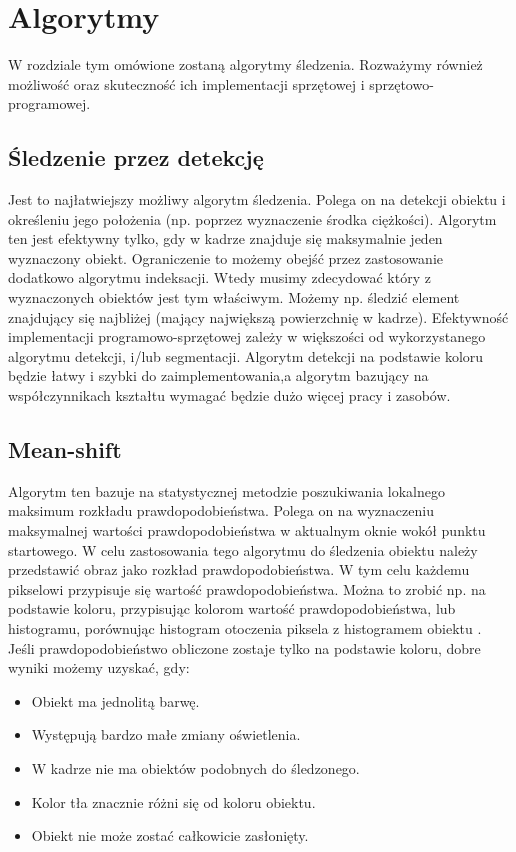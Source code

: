 \chapter{Algorytmy}
\label{cha:algorytmy}

W rozdziale tym omówione zostaną algorytmy śledzenia. Rozważymy również możliwość oraz skuteczność ich implementacji sprzętowej i sprzętowo-programowej.

\section{Śledzenie przez detekcję}
\label{sec:sledzenieprzezdetekcje}

Jest to najłatwiejszy możliwy algorytm śledzenia. Polega on na detekcji obiektu i określeniu jego położenia (np. poprzez wyznaczenie środka ciężkości). Algorytm ten jest efektywny tylko, gdy w kadrze znajduje się maksymalnie jeden wyznaczony obiekt. Ograniczenie to możemy obejść przez zastosowanie dodatkowo algorytmu indeksacji. Wtedy musimy zdecydować który z wyznaczonych obiektów jest tym właściwym. Możemy np. śledzić element znajdujący się najbliżej (mający największą powierzchnię w kadrze). Efektywność implementacji programowo-sprzętowej zależy w większości od wykorzystanego algorytmu detekcji, i/lub segmentacji. Algorytm detekcji na podstawie koloru będzie łatwy i szybki do zaimplementowania,a algorytm bazujący na współczynnikach kształtu  wymagać będzie dużo więcej pracy i zasobów.

\section{Mean-shift}
\label{sec:meanshift}

Algorytm ten bazuje na statystycznej metodzie poszukiwania lokalnego maksimum rozkładu prawdopodobieństwa. Polega on na wyznaczeniu maksymalnej wartości prawdopodobieństwa w aktualnym oknie wokół punktu startowego. W celu zastosowania tego algorytmu do śledzenia obiektu należy przedstawić obraz jako rozkład prawdopodobieństwa. W tym celu każdemu pikselowi przypisuje się wartość prawdopodobieństwa. Można to zrobić np. na podstawie koloru, przypisując kolorom wartość prawdopodobieństwa, lub histogramu, porównując histogram otoczenia piksela z histogramem obiektu \cite{CMS}. Jeśli prawdopodobieństwo obliczone zostaje tylko na podstawie koloru, dobre wyniki możemy uzyskać, gdy:
\begin{itemize}
\item Obiekt ma jednolitą barwę.
\item Występują bardzo małe zmiany oświetlenia.
\item W kadrze nie ma obiektów podobnych do śledzonego.
\item Kolor tła znacznie różni się od koloru obiektu.
\item Obiekt nie może zostać całkowicie zasłonięty.
\end{itemize}
